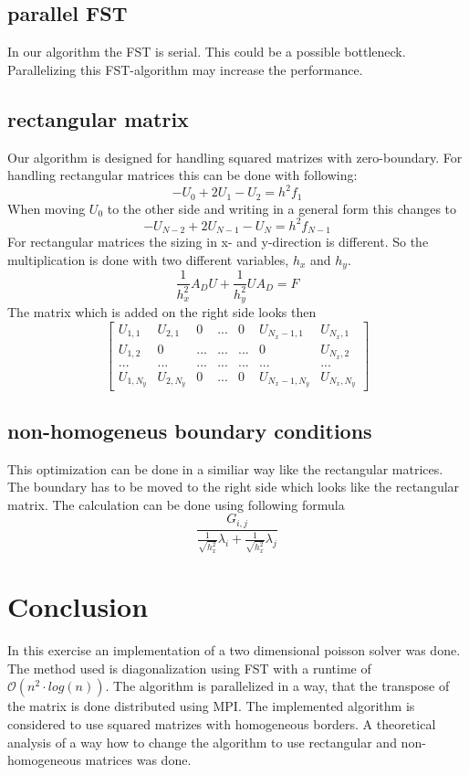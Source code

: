 \documentclass{article}
\begin{document}
\subsection{parallel FST}
In our algorithm the FST is serial. This could be a possible bottleneck. Parallelizing this FST-algorithm may increase the performance.
\subsection{rectangular matrix}
Our algorithm is designed for handling squared matrizes with zero-boundary. For handling rectangular matrices this can be done with following:
\begin{equation}
-U_0+2U_1-U_2=h^2f_1
\end{equation}
When moving $U_0$ to the other side and writing in a general form this changes to
\begin{equation}
-U_{N-2}+2U_{N-1}-U_N=h^2f_{N-1}
\end{equation}
For rectangular matrices the sizing in x- and y-direction is different. So the multiplication is done with two different variables, $h_x$ and $h_y$.
\begin{equation}
\frac{1}{h_x^2}A_DU+\frac{1}{h_y^2}UA_D=F
\end{equation}
The matrix which is added on the right side looks then
$$
\begin{bmatrix}
U_{1,1} & U_{2,1} & 0 & ... & 0 & U_{N_x-1,1} & U_{N_x,1} \\
U_{1,2} & 0 & ... & ... & ... & 0 & U_{N_x,2} \\
... & ... & ... & ... &... & ... & ... \\
U_{1,N_y} & U_{2,N_y} & 0 & ... & 0 & U_{N_x-1,N_y} & U_{N_x,N_y} 
\end{bmatrix}
$$
\subsection{non-homogeneus boundary conditions}
This optimization can be done in a similiar way like the rectangular matrices. The boundary has to be moved to the right side which looks like the rectangular matrix. The calculation can be done using following formula
\begin{equation}
\frac{G_{i,j}}{\frac{1}{\sqrt{h_x^2}}\lambda_i+\frac{1}{\sqrt{h_x^2}}\lambda_j}
\end{equation}
\newpage
\section{Conclusion}
In this exercise an implementation of a two dimensional poisson solver was done. The method used is diagonalization using FST with a runtime of $\mathcal{O}(n^2\cdot log(n))$. The algorithm is parallelized in a way, that the transpose of the matrix is done distributed using MPI. The implemented algorithm is considered to use squared matrizes with homogeneous borders. A theoretical analysis of a way how to change the algorithm to use rectangular and non-homogeneous matrices was done.
\end{document}
